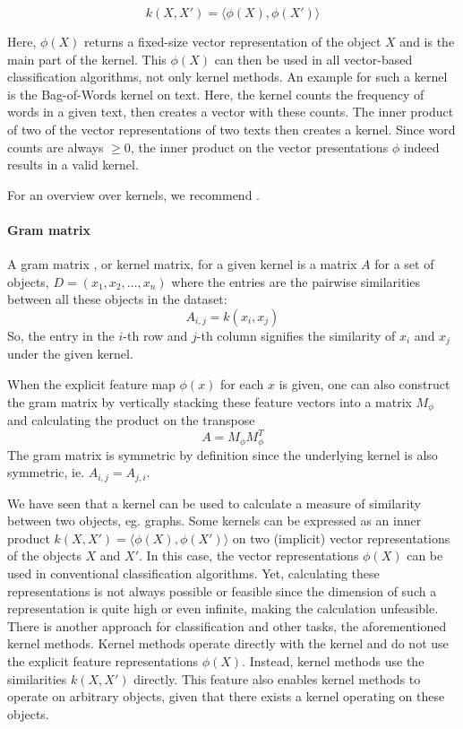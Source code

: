 \begin{equation*}
    k(X, X') = \langle \phi(X), \phi(X') \rangle
\end{equation*}

Here, $\phi(X)$ returns a fixed-size vector representation of the object $X$ and is the main part of the kernel.
This $\phi(X)$ can then be used in all vector-based classification algorithms, not only kernel methods.
An example for such a kernel is the Bag-of-Words kernel on text.
Here, the kernel counts the frequency of words in a given text, then creates a vector with these counts.
The inner product of two of the vector representations of two texts then creates a kernel.
Since word counts are always $\geq 0$, the inner product on the vector presentations $\phi$ indeed results in a valid kernel.

For an overview over kernels, we recommend \cite[p.~293]{Bishop2006}.

\paragraph{Gram matrix}
A gram matrix \cite[p.~293]{Bishop2006}, or kernel matrix, for a given kernel is a matrix $A$ for a set of objects, $D = (x_1, x_2, \ldots, x_n)$ where the entries are the pairwise similarities between all these objects in the dataset:
\begin{equation*}
A_{i,j} = k(x_i, x_j)
\end{equation*}
So, the entry in the $i$-th row and $j$-th column signifies the similarity of $x_i$ and $x_j$ under the given kernel.

When the explicit feature map $\phi(x)$ for each $x$ is given, one can also construct the gram matrix by vertically stacking these feature vectors into a matrix $M_{\phi}$ and calculating the product on the transpose
\begin{equation*}
A = M_{\phi} M_{\phi}^T
\end{equation*}
The gram matrix is symmetric by definition since the underlying kernel is also symmetric, ie. $A_{i,j} = A_{j, i}$.

We have seen that a kernel can be used to calculate a measure of similarity between two objects, eg. graphs.
Some kernels can be expressed as an inner product $k(X, X') = \langle \phi(X), \phi(X') \rangle$ on two (implicit) vector representations of the objects $X$ and $X'$.
In this case, the vector representations $\phi(X)$ can be used in conventional classification algorithms.
Yet, calculating these representations is not always possible or feasible since the dimension of such a representation is quite high or even infinite, making the calculation unfeasible.
There is another approach for classification and other tasks, the aforementioned kernel methods.
Kernel methods \cite[p.~291]{Bishop2006} operate directly with the kernel and do not use the explicit feature representations $\phi(X)$.
Instead, kernel methods use the similarities $k(X, X')$ directly.
This feature also enables kernel methods to operate on arbitrary objects, given that there exists a kernel operating on these objects.

